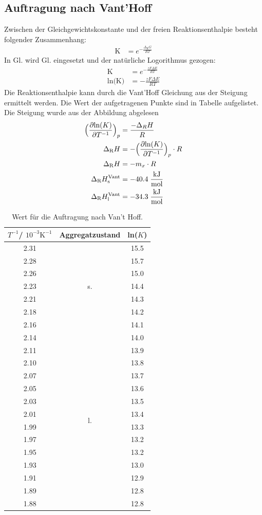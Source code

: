 \documentclass[12pt,a4paper,titlepage,headinclude,bibtotoc]{scrartcl}
\begin{document}
\subsection{Auftragung nach Vant'Hoff}
Zwischen der Gleichgewichtskonstante und der freien Reaktionsenthalpie besteht folgender Zusammenhang:
\begin{align}
\text{K}&=e^{-\frac{\Delta_\text{R} G}{RT}}
\end{align}
In Gl. wird Gl. eingesetzt und der natürliche Logorithmus gezogen:
\begin{align}
\text{K}&=e^{-\frac{zF\Delta E}{RT}}\\
\text{ln(K)}&=-\frac{zF\Delta E}{RT}
\end{align}
Die Reaktionsenthalpie kann durch die Vant'Hoff Gleichung aus der Steigung ermittelt werden. Die Wert der aufgetragenen Punkte sind in Tabelle aufgelistet. Die Steigung wurde aus der Abbildung abgelesen
\begin{align}
\Bigl(\frac{\partial\text{ln}(K)}{\partial{T}^{-1}}\Bigr)_p&=\frac{-\Delta_R H}{R}\\
\Delta_\text{R} H&=- \Bigl(\frac{\partial\text{ln}(K)}{\partial {T}^{-1}}\Bigr)_p\cdot R\\
\Delta_\text{R} H&=- m_x\cdot R\\
\Delta_\text{R} H_{\text{s}}^{\text{Vant}}&=-40.4\;\frac{\text{kJ}}{\text{mol}}\\
\Delta_\text{R} H_{\text{l}}^{\text{Vant}}&=-34.3\;\frac{\text{kJ}}{\text{mol}}\\
\end{align}
\begin{table}[h]
\centering
\caption{Wert für die Auftragung nach Van't Hoff.}
\begin{tabular}{c|c|c}
${T}^{-1}$/ $10^{-3}\text{K}^{-1}$ &Aggregatzustand& ln($K$) \\
\hline
2.31 &  \multirow{7}{*}{s.} & 15.5\\
2.28 & & 15.7 \\
2.26 & &15.0\\
2.23 & &14.4\\
2.21 & &14.3\\
2.18 &&14.2\\
2.16 &  &14.1\\
2.14 &  &14.0\\
\hline
2.11 & \multirow{12}{*}{l.} &13.9\\
2.10 &  &13.8\\
2.07 &  &13.7\\
2.05  &  &13.6\\
2.03 &  &13.5\\
2.01 &  &13.4\\
1.99 &  &13.3\\
1.97 &  &13.2\\
1.95 &  &13.2\\
1.93 &  &13.0\\
1.91 &  &12.9\\
1.89 &  &12.8\\
1.88 &  &12.8\\
\end{tabular}
\end{table}
\end{document}
